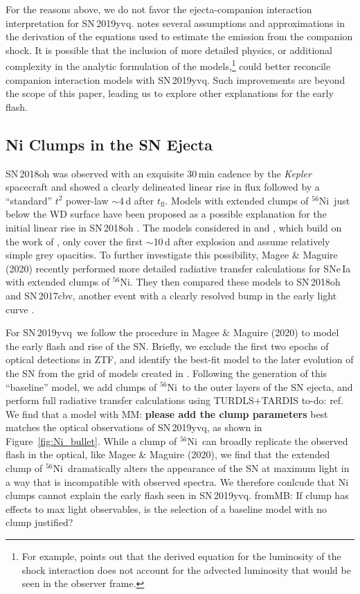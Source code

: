 \documentclass[twocolumn]{aastex63}
\newcommand{\magee}[1]{{\color{Rust} MM: \textbf{#1}}}
\newcommand{\frommb}[1]{{\color{purple} fromMB: {#1}}}
\newcommand{\todo}[1]{{\color{magenta} to-do: {#1}}}
\newcommand{\tfl}{$t_\mathrm{fl}$}
\newcommand{\radni}{$^{56}$Ni}
\newcommand{\sn}{SN\,2019yvq}
\begin{document}
For the reasons above, we do not favor the ejecta-companion interaction
interpretation for \sn. \citet{Kasen10a} notes several assumptions and
approximations in the derivation of the equations used to estimate the
emission from the companion shock. It is possible that the inclusion of more
detailed physics, or additional complexity in the analytic formulation of the
models,\footnote{For example, \citet{Kasen10a} points out that the derived
equation for the luminosity of the shock interaction does not account for the
advected luminosity that would be seen in the observer frame.} could better
reconcile companion interaction models with \sn. Such improvements are beyond
the scope of this paper, leading us to explore other explanations for the
early flash.

\subsection{Ni Clumps in the SN Ejecta}

SN\,2018oh was observed with an exquisite 30\,min cadence by the
\textit{Kepler} spacecraft and showed a clearly delineated linear rise in
flux followed by a ``standard'' $t^2$ power-law $\sim$4\,d after \tfl. Models
with extended clumps of \radni\ just below the WD surface have been proposed
as a possible explanation for the initial linear rise in SN\,2018oh
\citep{Shappee19,Dimitriadis19}. The models considered in \citet{Shappee19}
and \citet{Dimitriadis19}, which build on the work of \citet{Piro16}, only
cover the first $\sim$10\,d after explosion and assume relatively simple grey
opacities. To further investigate this possibility, Magee \& Maguire (2020)
recently performed more detailed radiative transfer calculations for SNe\,Ia
with extended clumps of \radni. They then compared these models to SN\,2018oh
and SN\,2017cbv, another event with a clearly resolved bump in the early
light curve \citep{Hosseinzadeh17}.

For \sn\ we follow the procedure in Magee \& Maguire (2020) to model the
early flash and rise of the SN. Briefly, we exclude the first two epochs of
optical detections in ZTF, and identify the best-fit model to the later
evolution of the SN from the grid of models created in \citet{Magee20}.
Following the generation of this ``baseline'' model, we add clumps of \radni\
to the outer layers of the SN ejecta, and perform full radiative transfer
calculations using TURDLS+TARDIS \todo{ref}. We find that a model with
\magee{please add the clump parameters} best matches the optical observations
of \sn, as shown in Figure~\ref{fig:Ni_bullet}. While a clump of \radni\ can
broadly replicate the observed flash in the optical, like Magee \& Maguire
(2020), we find that the extended clump of \radni\ dramatically alters the
appearance of the SN at maximum light in a way that is incompatible with
observed spectra. We therefore conlcude that Ni clumps cannot explain the
early flash seen in \sn. \frommb{If clump has effects to max light observables, is the selection of a baseline model with no clump justified?}
\end{document}

